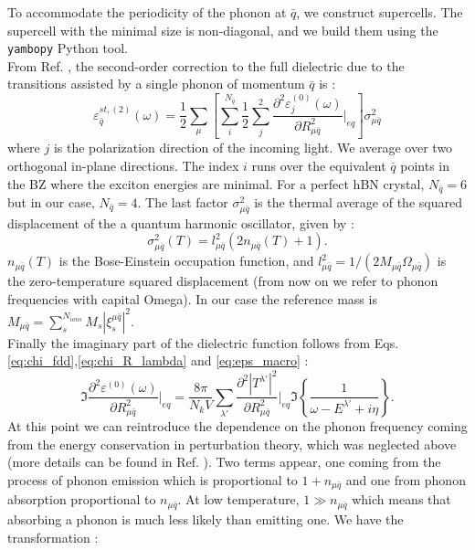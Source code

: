 To accommodate the periodicity of the phonon at $\bar{q}$, we construct supercells. The supercell with the minimal size is non-diagonal,\cite{lloyd2015lattice} and we build them using the \texttt{yambopy} Python tool.\cite{Sangalli_2019}\\
From Ref. \cite{zacharias2020theory}, the second-order correction to the full dielectric due to the transitions assisted by a single phonon of momentum $\bar{q}$ is :
\begin{equation}
	\varepsilon^{st,(2)}_{\bar{q}} (\omega) = \frac{1}{2} \sum_\mu \left[ \sum_i^{N_{\bar{q}}} \frac{1}{2} \sum_j^2 \frac{\partial^2 \varepsilon^{(0)}_j(\omega)}{\partial R^2_{\mu\bar{q}}} \biggr|_{eq} \right] \sigma^2_{\mu\bar{q}} \label{eq:eps_Taylor_2nd}
\end{equation}
where $j$ is the polarization direction of the incoming light. We average over two orthogonal in-plane directions. The index $i$ runs over the equivalent $\bar{q}$ points in the \acrshort{BZ} where the exciton energies are minimal. For a perfect hBN crystal, $N_{\bar{q}} = 6$ but in our case, $N_{\bar{q}} = 4$. The last factor $\sigma^2_{\mu\bar{q}}$ is the thermal average of the squared displacement of the a quantum harmonic oscillator, given by :
\begin{equation}
	\sigma^2_{\mu\bar{q}}(T) = l^2_{\mu\bar{q}} (2n_{\mu\bar{q}}(T) + 1).
\end{equation}
$n_{\mu\bar{q}}(T)$ is the Bose-Einstein occupation function, and $l^2_{\mu\bar{q}} = 1/(2M_{\mu\bar{q}}\Omega_{\mu\bar{q}})$ is the zero-temperature squared displacement (from now on we refer to phonon frequencies with capital Omega). In our case the reference mass is $M_{\mu\bar{q}} = \sum^{N_{ions}}_s M_s |\xi_s^{\mu\bar{q}}|^2$.\\
Finally the imaginary part of the dielectric function follows from Eqs. \eqref{eq:chi_fdd},\eqref{eq:chi_R_lambda} and \eqref{eq:eps_macro} : 
\begin{equation}
	\Im\frac{\partial^2 \varepsilon^{(0)}(\omega)}{\partial R^2_{\mu\bar{q}}}\biggr|_{eq} = \frac{8\pi}{N_k V} \sum_{\lambda'} \frac{\partial^2 |T^{\lambda'}|^2}{\partial R^2_{\mu\bar{q}}}\biggr|_{eq} \Im\left\{ \frac{1}{\omega - E^{\lambda'} + i\eta} \right\}.
\end{equation}
At this point we can reintroduce the dependence on the phonon frequency coming from the energy conservation in perturbation theory, which was neglected above (more details can be found in Ref. \cite{paleari2019first}). Two terms appear, one coming from the process of phonon emission which is proportional to $1 + n_{\mu\bar{q}}$ and one from phonon absorption proportional to $n_{\mu\bar{q}}$. At low temperature, $1 \gg n_{\mu\bar{q}}$ which means that absorbing a phonon is much less likely than emitting one. We have the transformation :
